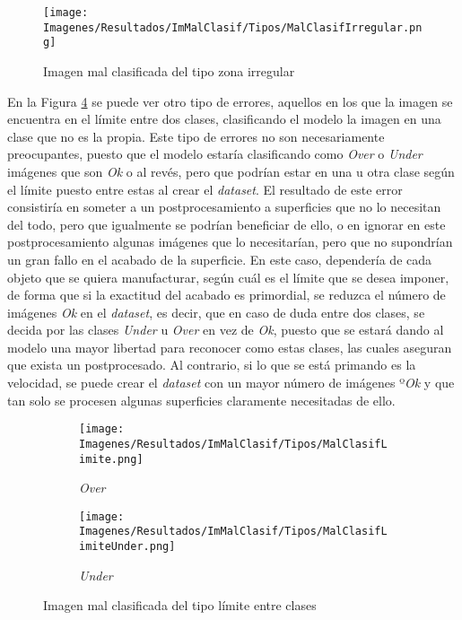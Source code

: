 \documentclass{report}
\begin{document}
\begin{figure}[H]
    \centering
    \texttt{[image: Imagenes/Resultados/ImMalClasif/Tipos/MalClasifIrregular.png]}
    \caption{ Imagen mal clasificada del tipo zona irregular  }
    \label{fig:TipoMalClasificadaIrregular}
\end{figure}


En la Figura \ref{fig:MalClasificadaLimite} se puede ver otro tipo de errores, aquellos en los que la imagen se encuentra en el límite entre dos clases, clasificando el modelo la imagen en una clase que no es la propia. Este tipo de errores no son necesariamente preocupantes, puesto que el modelo estaría clasificando como \textit{Over} o \textit{Under} imágenes que son \textit{Ok} o al revés, pero que podrían estar en una u otra clase según el límite puesto entre estas al crear el \textit{dataset}. El resultado de este error consistiría en someter a un postprocesamiento a superficies que no lo necesitan del todo, pero que igualmente se podrían beneficiar de ello, o en ignorar en este postprocesamiento algunas imágenes que lo necesitarían, pero que no supondrían un gran fallo en el acabado de la superficie. En este caso, dependería de cada objeto que se quiera manufacturar, según cuál es el límite que se desea imponer, de forma que si la exactitud del acabado es primordial, se reduzca el número de imágenes \textit{Ok} en el \textit{dataset}, es decir, que en caso de duda entre dos clases, se decida por las clases \textit{Under} u \textit{Over} en vez de \textit{Ok}, puesto que se estará dando al modelo una mayor libertad para reconocer como estas clases, las cuales aseguran que exista un postprocesado. Al contrario, si lo que se está primando es la velocidad, se puede crear el \textit{dataset} con un mayor número de imágenes º\textit{Ok} y que tan solo se procesen algunas superficies claramente necesitadas de ello.


\begin{figure}[H]
    \centering
            \begin{subfigure}[b]{0.45\linewidth}
	 	\centering
	 		\texttt{[image: Imagenes/Resultados/ImMalClasif/Tipos/MalClasifLimite.png]}
	 		\caption{ \textit{Over} }
                    \label{fig:MalClasificadaLimite1}
	 	\end{subfigure}
	 	\begin{subfigure}[b]{0.45\linewidth}
	 	\centering
	 		\texttt{[image: Imagenes/Resultados/ImMalClasif/Tipos/MalClasifLimiteUnder.png]}
	 		\caption{ \textit{Under} }
                    \label{fig:MalClasificadaLimite2}
	 	\end{subfigure}
   	 	\caption{ Imagen mal clasificada del tipo límite entre clases }
            \label{fig:MalClasificadaLimite}
\end{figure}
\end{document}
